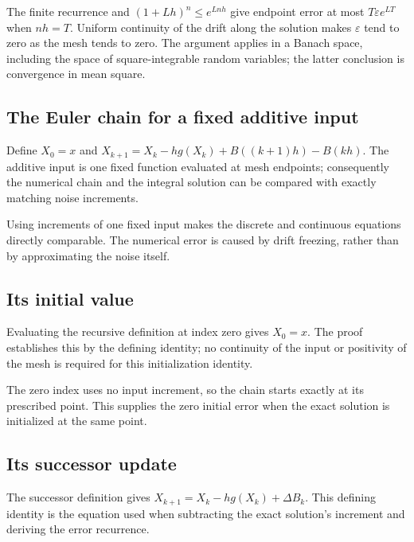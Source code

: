 \documentclass[11pt,a4paper]{article}
\begin{document}
The finite recurrence and \((1+Lh)^n\le e^{Lnh}\) give endpoint error at most \(T\varepsilon e^{LT}\) when \(nh=T\). Uniform continuity of the drift along the solution makes \(\varepsilon\) tend to zero as the mesh tends to zero. The argument applies in a Banach space, including the space of square-integrable random variables; the latter conclusion is convergence in mean square.


\subsection{\texorpdfstring{The Euler chain for a fixed additive input}{The Euler chain for a fixed additive input}}


Define \(X_0=x\) and \(X_{k+1}=X_k-hg(X_k)+B((k+1)h)-B(kh)\). The additive input is one fixed function evaluated at mesh endpoints; consequently the numerical chain and the integral solution can be compared with exactly matching noise increments.



Using increments of one fixed input makes the discrete and continuous equations directly comparable. The numerical error is caused by drift freezing, rather than by approximating the noise itself.


\subsection{\texorpdfstring{Its initial value}{Its initial value}}


Evaluating the recursive definition at index zero gives \(X_0=x\). The proof establishes this by the defining identity; no continuity of the input or positivity of the mesh is required for this initialization identity.



The zero index uses no input increment, so the chain starts exactly at its prescribed point. This supplies the zero initial error when the exact solution is initialized at the same point.


\subsection{\texorpdfstring{Its successor update}{Its successor update}}


The successor definition gives \(X_{k+1}=X_k-hg(X_k)+\Delta B_k\). This defining identity is the equation used when subtracting the exact solution's increment and deriving the error recurrence.
\end{document}
